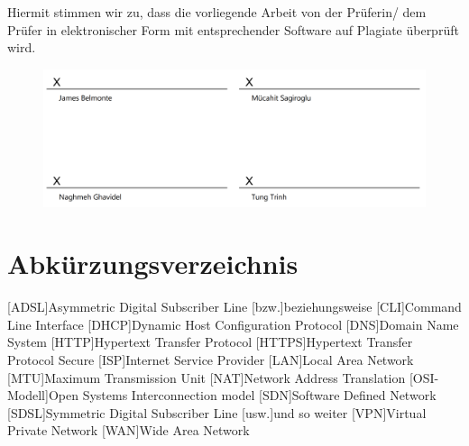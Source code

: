 \documentclass[fontsize=12pt,paper=a4,open=any,parskip=half,
  twoside=false,toc=listof,toc=bibliography,fleqn,leqno,
  captions=nooneline,captions=tableabove,british]{scrbook}
\begin{document}
Hiermit stimmen wir zu, dass die vorliegende Arbeit von der Prüferin/ dem Prüfer in elektronischer Form
mit entsprechender Software auf Plagiate überprüft wird.

\begin{figure}[H]
	\centering
	\includegraphics[width=1\linewidth]{Bilder/unterschrift}
\end{figure}

\tableofcontents
\listoffigures
\listoftables
\chapter{Abkürzungsverzeichnis}
\begin{acronym}
	[ADSL]{Asymmetric Digital Subscriber Line}
	[bzw.]{beziehungsweise}
	[CLI]{Command Line Interface}
	[DHCP]{Dynamic Host Configuration Protocol}
	[DNS]{Domain Name System}
	[HTTP]{Hypertext Transfer Protocol }
	[HTTPS]{Hypertext Transfer Protocol Secure}
	[ISP]{Internet Service Provider}
	[LAN]{Local Area Network}
	[MTU]{Maximum Transmission Unit}
	[NAT]{Network Address Translation}
	[OSI-Modell]{Open Systems Interconnection model}
	[SDN]{Software Defined Network}
	[SDSL]{Symmetric Digital Subscriber Line}
	[usw.]{und so weiter}
	[VPN]{Virtual Private Network}
	[WAN]{Wide Area Network}
\end{acronym}


\mainmatter %

\end{document}

